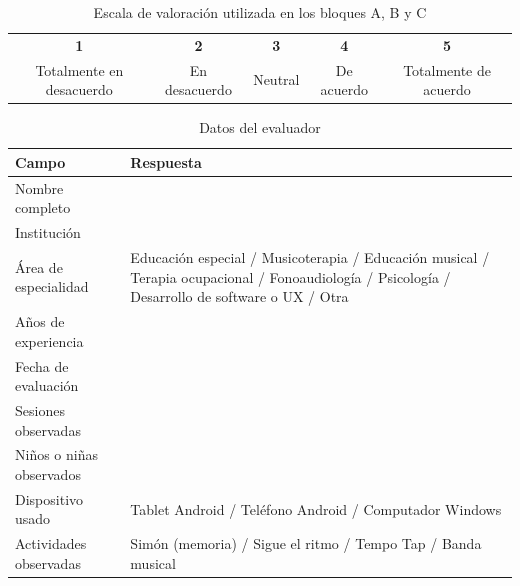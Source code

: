 
% 

\renewcommand{\arraystretch}{1.35}

\begin{table}[htbp]
\centering
\caption{Escala de valoración utilizada en los bloques A, B y C}
\label{tab:escala}
\begin{tabular}{ccccc}
\toprule
\textbf{1} & \textbf{2} & \textbf{3} & \textbf{4} & \textbf{5} \\
Totalmente en desacuerdo & En desacuerdo & Neutral & De acuerdo & Totalmente de acuerdo \\
\bottomrule
\end{tabular}
\end{table}

\begin{table}[htbp]
\centering
\caption{Datos del evaluador}
\label{tab:perfil}
\begin{tabularx}{\textwidth}{lX}
\toprule
\textbf{Campo} & \textbf{Respuesta} \\
\midrule
Nombre completo & \\
Institución & \\
Área de especialidad & Educación especial / Musicoterapia / Educación musical / Terapia ocupacional / Fonoaudiología / Psicología / Desarrollo de software o UX / Otra \\
Años de experiencia & \\
Fecha de evaluación & \\
Sesiones observadas & \\
Niños o niñas observados & \\
Dispositivo usado & Tablet Android / Teléfono Android / Computador Windows \\
Actividades observadas & Simón (memoria) / Sigue el ritmo / Tempo Tap / Banda musical \\
\bottomrule
\end{tabularx}
\end{table}

